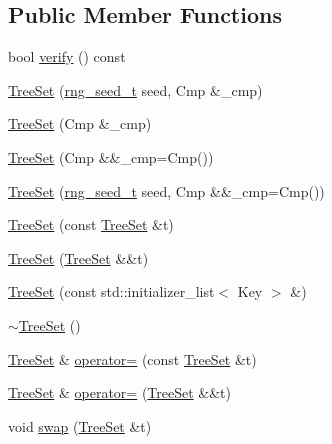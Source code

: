 \subsection*{Public Member Functions}
\begin{DoxyCompactItemize}
\item 
bool \hyperlink{class_designar_1_1_tree_set_a36429c32537114bae9108bf57171d8c6}{verify} () const
\item 
\hyperlink{class_designar_1_1_tree_set_a188c4a4093595878dba7e38b249cb024}{Tree\+Set} (\hyperlink{namespace_designar_ad621b5646d45288c5d6a1e1dfe7531a8}{rng\+\_\+seed\+\_\+t} seed, Cmp \&\+\_\+cmp)
\item 
\hyperlink{class_designar_1_1_tree_set_adeb0456caadfe5e105d2070bf8405d47}{Tree\+Set} (Cmp \&\+\_\+cmp)
\item 
\hyperlink{class_designar_1_1_tree_set_a41e2a227975e1e8adfe261adf99502e7}{Tree\+Set} (Cmp \&\&\+\_\+cmp=Cmp())
\item 
\hyperlink{class_designar_1_1_tree_set_a18b64c4f5ac3d0a4eb4d4e242ea4b4df}{Tree\+Set} (\hyperlink{namespace_designar_ad621b5646d45288c5d6a1e1dfe7531a8}{rng\+\_\+seed\+\_\+t} seed, Cmp \&\&\+\_\+cmp=Cmp())
\item 
\hyperlink{class_designar_1_1_tree_set_adca348df928acd414db780df7ba541c1}{Tree\+Set} (const \hyperlink{class_designar_1_1_tree_set}{Tree\+Set} \&t)
\item 
\hyperlink{class_designar_1_1_tree_set_a3bcb33bcd631e61727cd5e743f83b474}{Tree\+Set} (\hyperlink{class_designar_1_1_tree_set}{Tree\+Set} \&\&t)
\item 
\hyperlink{class_designar_1_1_tree_set_a177fd1706ba0536b0bc10787c561836c}{Tree\+Set} (const std\+::initializer\+\_\+list$<$ Key $>$ \&)
\item 
\hyperlink{class_designar_1_1_tree_set_af1c4be1e69a6bcaab42f81668df410d5}{$\sim$\+Tree\+Set} ()
\item 
\hyperlink{class_designar_1_1_tree_set}{Tree\+Set} \& \hyperlink{class_designar_1_1_tree_set_a555a6bff8e5771f3cd7a36228678fdcf}{operator=} (const \hyperlink{class_designar_1_1_tree_set}{Tree\+Set} \&t)
\item 
\hyperlink{class_designar_1_1_tree_set}{Tree\+Set} \& \hyperlink{class_designar_1_1_tree_set_ae32129aa1ab3d699d72399b35e9d22a5}{operator=} (\hyperlink{class_designar_1_1_tree_set}{Tree\+Set} \&\&t)
\item 
void \hyperlink{class_designar_1_1_tree_set_a8b6afa1f2400d4d7e1dc9694046eadcb}{swap} (\hyperlink{class_designar_1_1_tree_set}{Tree\+Set} \&t)

\end{DoxyCompactItemize}
